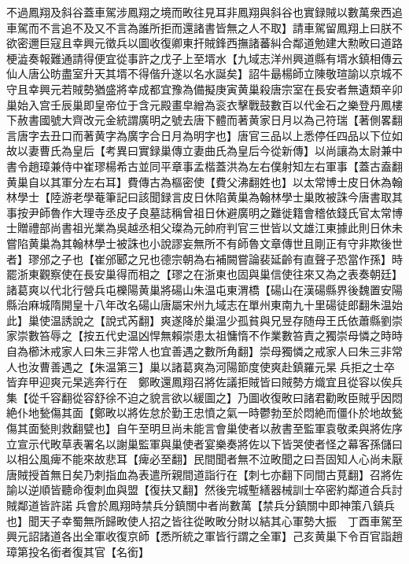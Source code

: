 不過鳳翔及斜谷蓋車駕涉鳳翔之境而畋往見耳非鳳翔與斜谷也實録賊以數萬衆西追車駕而不言追不及又不言為誰所拒而還諸書皆無之人不取】請車駕留鳳翔上曰朕不欲密邇巨寇且幸興元徵兵以圖收復卿東扞賊鋒西撫諸蕃糾合鄰道勉建大勲畋曰道路梗澁奏報難通請得便宜從事許之戊子上至壻水【九域志洋州興道縣有壻水鎮相傳云仙人唐公昉盡室升天其壻不得偕升遂以名水誕矣】詔牛朂楊師立陳敬瑄諭以京城不守且幸興元若賊勢猶盛將幸成都宜豫為備擬庚寅黄巢殺唐宗室在長安者無遺類辛卯巢始入宫壬辰巢即皇帝位于含元殿畫皁繒為衮衣擊戰鼓數百以代金石之樂登丹鳳樓下赦書國號大齊改元金統謂廣明之號去唐下體而著黄家日月以為己符瑞【著側畧翻言唐字去丑口而著黄字為廣字合日月為明字也】唐官三品以上悉停任四品以下位如故以妻曹氏為皇后【考異曰實録巢傳立妻曲氏為皇后今從新傳】以尚讓為太尉兼中書令趙璋兼侍中崔璆楊希古並同平章事孟楷蓋洪為左右僕射知左右軍事【蓋古盍翻黄巢自以其軍分左右耳】費傳古為樞密使【費父沸翻姓也】以太常博士皮日休為翰林學士【陸游老學菴筆記曰該聞録言皮日休陷黄巢為翰林學士巢敗被誅今唐書取其事按尹師魯作大理寺丞皮子良墓誌稱曾祖日休避廣明之難徙籍會稽依錢氏官太常博士贈禮部尚書祖光業為吳越丞相父璨為元帥府判官三世皆以文雄江東據此則日休未嘗陷黄巢為其翰林學士被誅也小說謬妄無所不有師魯文章傳世且剛正有守非欺後世者】璆邠之子也【崔邠郾之兄也德宗朝為右補闕嘗論裴延齡有直聲子恐當作孫】時罷浙東觀察使在長安巢得而相之【璆之在浙東也固與巢信使往來又為之表奏朝廷】諸葛爽以代北行營兵屯櫟陽黄巢將碭山朱温屯東渭橋【碭山在漢碭縣界後魏置安陽縣治麻城隋開皇十八年改名碭山唐屬宋州九域志在單州東南九十里碭徒郎翻朱温始此】巢使温誘說之【說式芮翻】爽遂降於巢温少孤貧與兄昱存随母王氏依蕭縣劉崇家崇數笞辱之【按五代史温凶悍無賴崇患太祖慵惰不作業數笞責之獨崇母憐之時時自為櫛沐戒家人曰朱三非常人也宜善遇之數所角翻】崇母獨憐之戒家人曰朱三非常人也汝曹善遇之【朱温第三】巢以諸葛爽為河陽節度使爽赴鎮羅元杲兵拒之士卒皆弃甲迎爽元杲逃奔行在　鄭畋還鳳翔召將佐議拒賊皆曰賊勢方熾宜且從容以俟兵集【從千容翻從容舒徐不迫之貌言欲以緩圖之】乃圖收復畋曰諸君勸畋臣賊乎因悶絶仆地甃傷其面【鄭畋以將佐怠於勤王忠憤之氣一時鬱勃至於悶絶而僵仆於地故甃傷其面甃則救翻甓也】自午至明旦尚未能言會巢使者以赦書至監軍袁敬柔與將佐序立宣示代畋草表署名以謝巢監軍與巢使者宴樂奏將佐以下皆哭使者怪之幕客孫儲曰以相公風痺不能來故悲耳【痺必至翻】民間聞者無不泣畋聞之曰吾固知人心尚未厭唐賊授首無日矣乃刺指血為表遣所親間道詣行在【刺七亦翻下同間古莧翻】召將佐諭以逆順皆聽命復刺血與盟【復扶又翻】然後完城塹繕器械訓士卒密約鄰道合兵討賊鄰道皆許諾兵會於鳳翔時禁兵分鎮關中者尚數萬【禁兵分鎮關中即神策八鎮兵也】聞天子幸蜀無所歸畋使人招之皆往從畋畋分財以結其心軍勢大振　丁酉車駕至興元詔諸道各出全軍收復京師【悉所統之軍皆行謂之全軍】己亥黄巢下令百官詣趙璋第投名銜者復其官【名銜】

